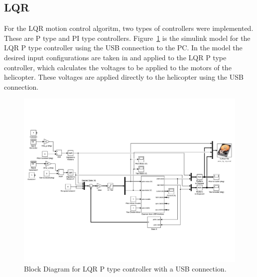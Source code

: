 \subsection{LQR}
For the LQR motion control algoritm, two types of controllers were implemented.  These are P type and PI type controllers.  Figure~\ref{fig:LQR_P_USB_Block_Diagram} is the simulink model for the LQR P type controller using the USB connection to the PC.  In the model the desired input configurations are taken in and applied to the LQR P type controller, which calculates the voltages to be applied to the motors of the helicopter.  These voltages are applied directly to the helicopter using the USB connection.
\begin{figure}[!htbp]
    \centering
    \includegraphics[width=.8\textwidth,keepaspectratio=true]{figs/img/LQR_USB}
    \caption{Block Diagram for LQR P type controller with a USB connection.}
    \label{fig:LQR_P_USB_Block_Diagram}
\end{figure}

